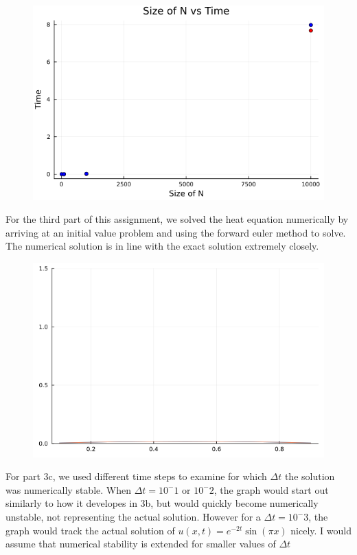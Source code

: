 \documentclass[a4paper,10pt,BCOR10mm,oneside,headsepline]{scrartcl}
\begin{document}
\begin{figure}[h]
\centering
\includegraphics[scale=0.4]{denseSparsePlot.png}
\end{figure}


For the third part of this assignment, we solved the heat equation numerically by arriving at an initial value problem and using the
forward euler method to solve. The numerical solution is in line with the exact solution extremely closely.

\begin{figure}[h]
\centering
\includegraphics[scale=0.4]{heatPlot.png}
\end{figure}

For part 3c, we used different time steps to examine for which $\Delta t$ the solution was numerically stable. When $\Delta t = 10^-1$ or $10^-2$,
the graph would start out similarly to how it developes in 3b, but would quickly become numerically unstable, not representing the actual solution.
However for a $\Delta t = 10^-3$, the graph would track the actual solution of $u(x, t) = e^{−2t}\sin(πx)$ nicely. I would assume that numerical
stability is extended for smaller values of $\Delta t$
\end{document}
